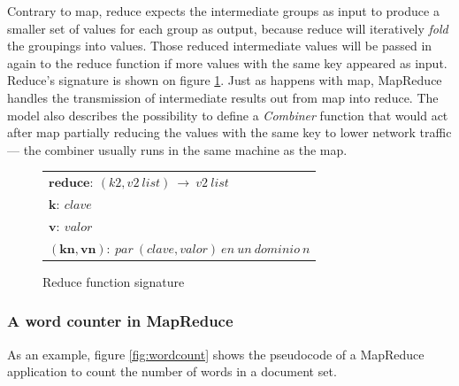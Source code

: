 Contrary to map, reduce expects the intermediate groups as input to produce a smaller set of values for each group as output, because reduce will iteratively \emph{fold} the groupings into values. Those reduced intermediate values will be passed in again to the reduce function if more values with the same key appeared as input. Reduce's signature is shown on figure \ref{fig:reduce}. Just as happens with map, MapReduce handles the transmission of intermediate results out from map into reduce. The model also describes the possibility to define a \emph{Combiner} function that would act after map partially reducing the values with the same key to lower network traffic --- the combiner usually runs in the same machine as the map.

\begin{figure}[tbp]
\begin{center}
\begin{tabular}{|l|}
\hline
$\mathbf{reduce:} \: \left( k2,v2 \: list \right) \: \rightarrow \: v2 \: list$ \\
$\mathbf{k:} \: clave$ \\
$\mathbf{v:} \: valor$ \\
$\mathbf{\left(kn,vn \right):} \: par \: \left(clave,valor\right) \: en \: un \: dominio \: n$ \\
\hline
\end{tabular}
\caption{Reduce function signature}
\label{fig:reduce}
\end{center}
\end{figure}

\subsubsection{A word counter in MapReduce}\label{subsubsec:wordcount}
\noindent As an example, figure \ref{fig:wordcount} shows the pseudocode of a MapReduce application to count the number of words in a document set.

